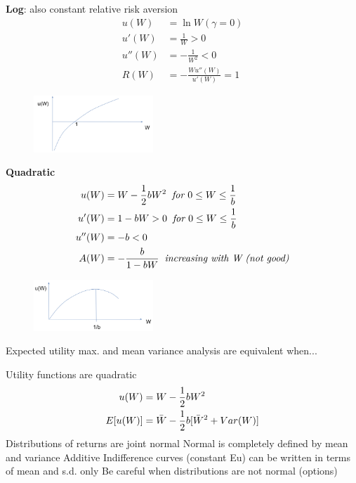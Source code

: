 \documentclass[
14pt,notheorems,hyperref={pdfauthor=whatever}
]{beamer}
\begin{document}
\begin{frame}
\textbf{Log}: also constant relative risk aversion\\
\begin{align*}
    u(W)&=\ln{W} (\gamma=0)\\
    u'(W)&=\frac{1}{W}>0\\
    u''(W)&=-\frac{1}{W^2}<0\\
    R(W)&=-\frac{Wu''(W)}{u'(W)}=1
\end{align*}
\begin{figure}[logarithmic]
    \includegraphics[width=0.4\textwidth]{L1-log}
    \centering
\end{figure}
\end{frame}

\begin{frame}
\textbf{Quadratic}\\
\begin{align*}
    u(W)&=W-\frac{1}{2}bW^2 \textit{\;\;for } 0\leq W\leq \frac{1}{b}\\
    u'(W)&=1-bW>0 \textit{\;\;for } 0\leq W\leq \frac{1}{b}\\
    u''(W)&=-b<0\\
    A(W)&=-\frac{b}{1-bW} \textit{\;\;increasing with W (not good)}
\end{align*}
\begin{figure}[quadratic]
    \includegraphics[width=0.4\textwidth]{L1-quad}
    \centering
\end{figure}
\end{frame}

\begin{frame}
Expected utility max. and mean variance analysis are equivalent when...\\
\hfill \break
\begin{outline}
    \1 Utility functions are quadratic
    \begin{align*}
        u(W)&=W-\frac{1}{2}bW^2\\
        E[u(W)]&=\Bar{W}-\frac{1}{2}b[\Bar{W}^2+Var(W)]
    \end{align*}
    \1 Distributions of returns are joint normal
        \2 Normal is completely defined by mean and variance
        \2 Additive
        \2 Indifference curves (constant Eu) can be written in terms of mean and s.d. only
    \1 Be careful when distributions are not normal (options)
\end{outline}
\end{frame}
\end{document}
